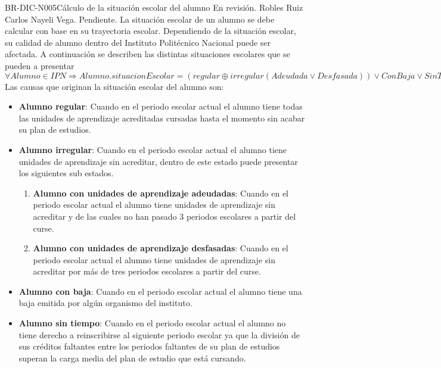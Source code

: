 \begin{BusinessRule}{BR-DIC-N005}{Cálculo de la situación escolar del alumno}{\bcAutorization}
	{\btEnabler}     %
	{\blControlling}    %
	\BRItem[Estado] En revisión.
	 Robles Ruiz Carlos 
	 Nayeli Vega.
	 Pendiente.
		\label{ch:reglas-CalculoSituacion} 
	\BRItem[Descripción] La situación escolar de un alumno se debe calcular con base en su trayectoria escolar. Dependiendo de la situación escolar, su calidad de alumno dentro del Instituto Politécnico Nacional puede ser afectada. A continuación se describen las distintas situaciones escolares que se pueden a presentar
	\BRItem[Sentencia] $\forall Alumno \in IPN \Rightarrow Alumno.situacionEscolar= (regular \oplus irregular(Adeudada  \lor Desfasada )) \lor ConBaja \lor SinTiempo$ 
	Las causas que originan la situación escolar del alumno son:
		\begin{itemize}
		\item \textbf{Alumno regular}: Cuando en el periodo escolar actual el alumno tiene todas las unidades de aprendizaje acreditadas cursadas hasta el momento sin acabar su plan de estudios.
		\item \textbf{Alumno irregular}: Cuando en el periodo escolar actual el alumno tiene unidades de aprendizaje sin acreditar, dentro de este estado puede presentar los siguientes sub estados.
		\begin{enumerate}
		\item \textbf{Alumno con unidades de aprendizaje adeudadas}: Cuando en el periodo escolar actual el alumno tiene unidades de aprendizaje sin acreditar y de las cuales no han pasado 3 periodos escolares a partir del curse.
		\item \textbf{Alumno con unidades de aprendizaje desfasadas}: Cuando en el periodo escolar actual el alumno tiene unidades de aprendizaje sin acreditar por más de tres periodos escolares a partir del curse.
		\end{enumerate}					
		\item \textbf{Alumno con baja}: Cuando en el periodo escolar actual el alumno tiene una baja emitida por algún organismo del instituto.
		\item \textbf{Alumno sin tiempo}: Cuando en el periodo escolar actual el alumno no tiene derecho a reinscribirse al siguiente periodo escolar ya que la división de sus créditos faltantes entre los periodos faltantes de su plan de estudios superan la carga media del plan de estudio que está cursando.

\end{itemize}
\end{BusinessRule}
